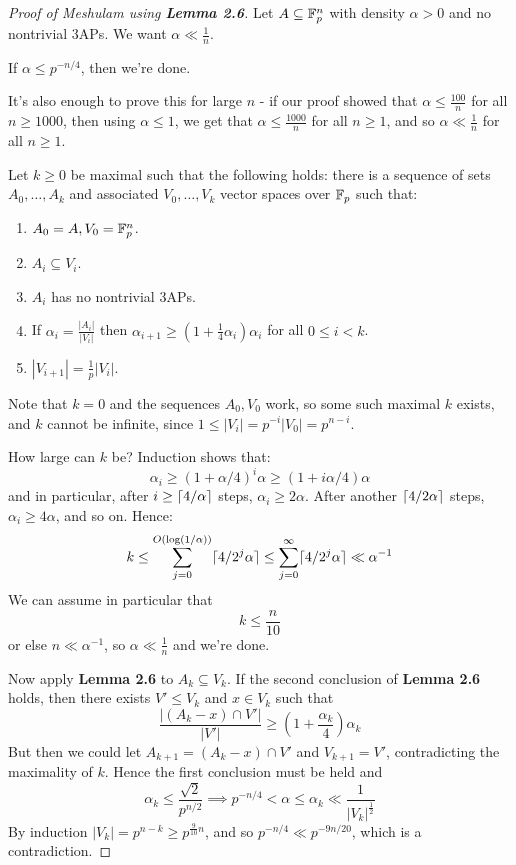 \documentclass[10pt,a4paper]{article}
\begin{document}
\begin{proof}[Proof of Meshulam using \textbf{Lemma 2.6}]
  Let $A \subseteq \mathbb{F}_p^n$ with density $\alpha > 0$ and no nontrivial 3APs. We want $\alpha \ll \frac{1}{n}$.

  If $\alpha \leq p^{-n/4}$, then we're done.

  It's also enough to prove this for large $n$ - if our proof showed that $\alpha \leq \frac{100}{n}$ for all $n \geq 1000$, then using $\alpha \leq 1$, we get that $\alpha \leq \frac{1000}{n}$ for all $n \geq 1$, and so $\alpha \ll \frac{1}{n}$ for all $n \geq 1$.

  Let $k \geq 0$ be maximal such that the following holds: there is a sequence of sets $A_0, \ldots, A_k$ and associated $V_0, \ldots, V_k$ vector spaces over $\mathbb{F}_p$ such that:
  \begin{enumerate}
    \item $A_0 = A, V_0 = \mathbb{F}_p^n$.
    \item $A_i \subseteq V_i$.
    \item $A_i$ has no nontrivial 3APs.
    \item If $\alpha_i = \frac{|A_i|}{|V_i|}$ then $\alpha_{i+1} \geq (1+\frac14\alpha_i)\alpha_i$ for all $0 \leq i < k$.
    \item $|V_{i+1}| = \frac{1}{p}|V_i|$.
  \end{enumerate}
  Note that $k=0$ and the sequences $A_0, V_0$ work, so some such maximal $k$ exists, and $k$ cannot be infinite, since $1\leq |V_i| = p^{-i}|V_0| = p^{n-i}$.

  How large can $k$ be? Induction shows that:
  \[\alpha_i \geq (1+\alpha/4)^i \alpha \geq (1+i\alpha/4)\alpha\]
  and in particular, after $i \geq \lceil 4/\alpha \rceil$ steps, $\alpha_i \geq 2\alpha$. After another $\lceil 4/2\alpha \rceil$ steps, $\alpha_i \geq 4\alpha$, and so on. Hence:
  \[k \leq \sum_{j=0}^{O(\log(1/\alpha))} \lceil 4/2^j\alpha \rceil \leq \sum_{j=0}^\infty \lceil 4/2^j\alpha \rceil \ll \alpha^{-1}\]
  We can assume in particular that
  \[k \leq \frac{n}{10}\]
  or else $n \ll \alpha^{-1}$, so $\alpha \ll \frac{1}{n}$ and we're done.

  Now apply \textbf{Lemma 2.6} to $A_k \subseteq V_k$. If the second conclusion of \textbf{Lemma 2.6} holds, then there exists $V' \leq V_k$ and $x \in V_k$ such that
  \[\frac{|(A_k-x)\cap V'|}{|V'|} \geq (1+\frac{\alpha_k}{4})\alpha_k\]
  But then we could let $A_{k+1} = (A_k-x)\cap V'$ and $V_{k+1} = V'$, contradicting the maximality of $k$. Hence the first conclusion must be held and
  \[\alpha_k \leq \frac{\sqrt{2}}{p^{n/2}} \implies p^{-n/4} <\alpha \leq  \alpha_k \ll \frac{1}{|V_k|^{\frac12}}\]
  By induction $|V_k| = p^{n-k} \geq p^{\frac{9}{10}n}$, and so $p^{-n/4} \ll p^{-9n/20}$, which is a contradiction.
\end{proof}
\end{document}
